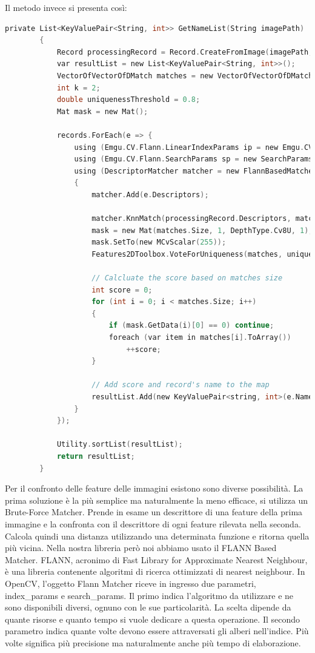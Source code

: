 \documentclass[twoside]{supsistudent}
\begin{document}
Il metodo invece si presenta così:

\begin{lstlisting}[language=C]
 private List<KeyValuePair<String, int>> GetNameList(String imagePath)
        {
            Record processingRecord = Record.CreateFromImage(imagePath, "");
            var resultList = new List<KeyValuePair<String, int>>();
            VectorOfVectorOfDMatch matches = new VectorOfVectorOfDMatch();
            int k = 2;
            double uniquenessThreshold = 0.8;
            Mat mask = new Mat();

            records.ForEach(e => {
                using (Emgu.CV.Flann.LinearIndexParams ip = new Emgu.CV.Flann.LinearIndexParams())
                using (Emgu.CV.Flann.SearchParams sp = new SearchParams())
                using (DescriptorMatcher matcher = new FlannBasedMatcher(ip, sp))
                {
                    matcher.Add(e.Descriptors);

                    matcher.KnnMatch(processingRecord.Descriptors, matches, k, null);
                    mask = new Mat(matches.Size, 1, DepthType.Cv8U, 1);
                    mask.SetTo(new MCvScalar(255));
                    Features2DToolbox.VoteForUniqueness(matches, uniquenessThreshold, mask);

                    // Calcluate the score based on matches size
                    int score = 0;
                    for (int i = 0; i < matches.Size; i++)
                    {
                        if (mask.GetData(i)[0] == 0) continue;
                        foreach (var item in matches[i].ToArray())
                            ++score;
                    }

                    // Add score and record's name to the map
                    resultList.Add(new KeyValuePair<string, int>(e.Name, score));
                }
            });

            Utility.sortList(resultList);
            return resultList;
        }
\end{lstlisting}
Per il confronto delle feature delle immagini esistono sono diverse possibilità. La prima soluzione è la più semplice ma naturalmente la meno efficace, si utilizza un Brute-Force Matcher. Prende in esame un descrittore di una feature della prima immagine e la confronta con il descrittore di ogni feature rilevata nella seconda. Calcola quindi una distanza utilizzando una determinata funzione e ritorna quella più vicina. Nella nostra libreria però noi abbiamo usato il FLANN Based Matcher. FLANN, acronimo di Fast Library for Approximate Nearest Neighbour, è una libreria contenente algoritmi di ricerca ottimizzati di nearest neighbour. In OpenCV, l'oggetto Flann Matcher riceve in ingresso due parametri, index\_params e search\_params. Il primo indica l'algoritmo da utilizzare e ne sono disponibili diversi, ognuno con le sue particolarità. La scelta dipende da quante risorse e quanto tempo si vuole dedicare a questa operazione. Il secondo parametro indica quante volte devono essere attraversati gli alberi nell'indice. Più volte significa più precisione ma naturalmente anche più tempo di elaborazione. 
\end{document}

